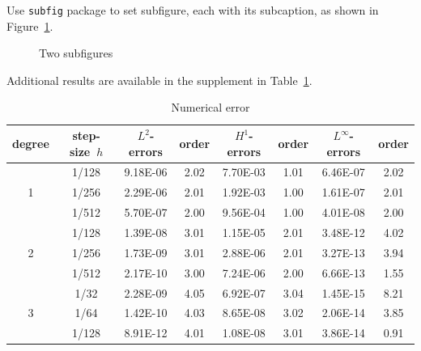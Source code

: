\documentclass[10pt,reqno,final]{article}
\theoremstyle{plain}
\theoremstyle{definition}
\theoremstyle{remark}
\numberwithin{equation}{section}
\numberwithin{figure}{section}
\numberwithin{table}{section}
\begin{document}
Use \texttt{subfig} package to set subfigure, each with its subcaption, as shown in Figure~\ref{fig:twosubfig}.

\begin{figure}[htp!]
\centering
{}
\qquad
{}
\caption{Two subfigures}
\label{fig:twosubfig}
\end{figure}

Additional results are available in the supplement in Table~\ref{tab:foo}.

\begin{table}[!htp]
\centering
\renewcommand\arraystretch{1.2} %
\caption{Numerical error}
\label{tab:foo}
\begin{tabular}{c|c|cc|cc|cc}
\hline
degree & step-size~$h$ & $L^2$-errors & order & $H^1$-errors & order & $L^\infty$-errors & order \\
\hline
  & 1/128 & 9.18E-06 & 2.02 & 7.70E-03 & 1.01 & 6.46E-07 & 2.02 \\
1 & 1/256 & 2.29E-06 & 2.01 & 1.92E-03 & 1.00 & 1.61E-07 & 2.01 \\
  & 1/512 & 5.70E-07 & 2.00 & 9.56E-04 & 1.00 & 4.01E-08 & 2.00 \\
\hline  %
  & 1/128 & 1.39E-08 & 3.01 & 1.15E-05 & 2.01 & 3.48E-12 & 4.02 \\
2 & 1/256 & 1.73E-09 & 3.01 & 2.88E-06 & 2.01 & 3.27E-13 & 3.94 \\
  & 1/512 & 2.17E-10 & 3.00 & 7.24E-06 & 2.00 & 6.66E-13 & 1.55 \\
\hline  %
  & 1/32  & 2.28E-09 & 4.05 & 6.92E-07 & 3.04 & 1.45E-15 & 8.21 \\
3 & 1/64  & 1.42E-10 & 4.03 & 8.65E-08 & 3.02 & 2.06E-14 & 3.85 \\
  & 1/128 & 8.91E-12 & 4.01 & 1.08E-08 & 3.01 & 3.86E-14 & 0.91 \\
\hline
\end{tabular}
\end{table}
\end{document}
